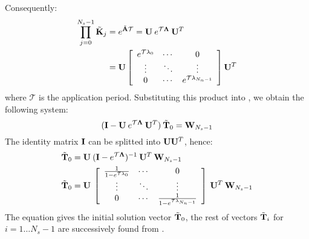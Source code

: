 Consequently:
\begin{align*}
  \prod_{j = 0}^{N_s - 1} \tilde{\mathbf{K}}_j & = e^{\tilde{\mathbf{A}} \mathcal{T}} = \mathbf{U} \: e^{\mathcal{T} \mathbf{\Lambda}} \: \mathbf{U}^T \\
    & = \mathbf{U} \left[
      \begin{array}{ccc}
        e^{\mathcal{T} \lambda_0} & \cdots & 0 \\
        \vdots & \ddots & \vdots \\
        0 & \cdots & e^{\mathcal{T} \lambda_{N_n - 1}}
      \end{array}
    \right] \mathbf{U}^T
\end{align*}
where $\mathcal{T}$ is the application period. Substituting this product into , we obtain the following system:
\[
  (\mathbf{I} - \mathbf{U} \: e^{\mathcal{T} \mathbf{\Lambda}} \: \mathbf{U}^T) \: \tilde{\mathbf{T}}_0 = \mathbf{W}_{N_s - 1}
\]
The identity matrix $\mathbf{I}$ can be splitted into $\mathbf{U} \mathbf{U}^T$, hence:
\begin{align*}
  & \tilde{\mathbf{T}}_0 = \mathbf{U} \: (\mathbf{I} - e^{\mathcal{T} \mathbf{\Lambda}})^{-1} \: \mathbf{U}^T \: \mathbf{W}_{N_s - 1} \\
  & \tilde{\mathbf{T}}_0 = \mathbf{U} \: \left[
      \begin{array}{ccc}
        \frac{1}{1 - e^{\mathcal{T} \lambda_0}} & \cdots & 0 \\
        \vdots & \ddots & \vdots \\
        0 & \cdots & \frac{1}{1 - e^{\mathcal{T} \lambda_{N_n - 1}}}
      \end{array}
    \right] \: \mathbf{U}^T \: \mathbf{W}_{N_s - 1}
\end{align*}
The equation gives the initial solution vector $\tilde{\mathbf{T}}_0$, the rest of vectors $\tilde{\mathbf{T}}_i$ for \mbox{$i = 1 \dots N_s - 1$} are successively found from .


